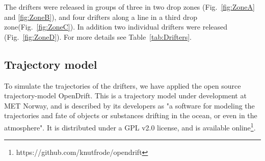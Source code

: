 \documentclass[12pt,a4paper,english]{article}
\begin{document}
The drifters were released in groups of three in two drop zones (Fig.~\ref{fig:ZoneA} and \ref{fig:ZoneB}), and four drifters along a line in a third drop zone(Fig.~\ref{fig:ZoneC}). In addition two individual drifters were released (Fig.~\ref{fig:ZoneD}). For more details see Table~\ref{tab:Drifters}.

\subsection{Trajectory model}
\label{sect:trajmod}
To simulate the trajectories of the drifters, we have applied the open source trajectory-model OpenDrift. This is a trajectory model under development at MET Norway, and is described by its developers as "a software for modeling the trajectories and fate of objects or substances drifting in the ocean, or even in the atmosphere". It is distributed under a GPL v2.0 license, and is available online\footnote{https://github.com/knutfrode/opendrift}.
\end{document}
